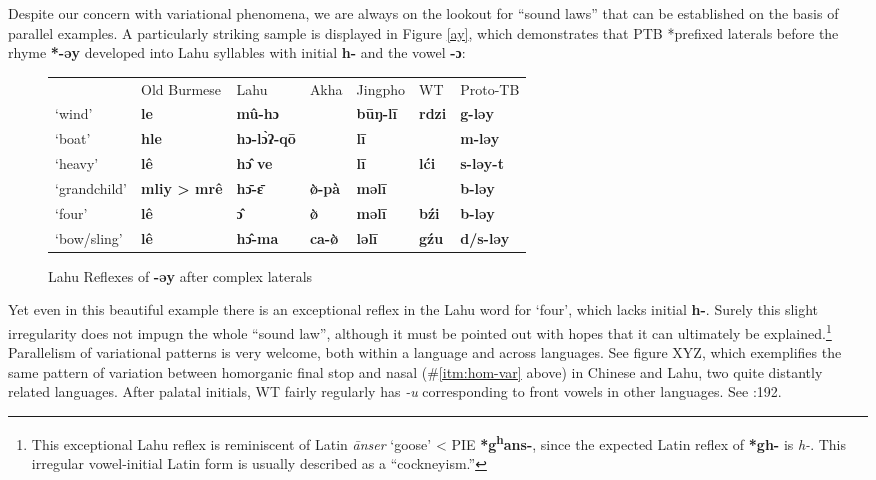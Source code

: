 Despite our concern with variational phenomena, we are always on the lookout for “sound laws” that can be established on the basis of parallel examples. A particularly striking sample is displayed in Figure \ref{ay}, which demonstrates that PTB *prefixed laterals before the rhyme \textbf{*-əy} developed into Lahu syllables with initial \textbf{h-} and the vowel \textbf{-ɔ}:

\begin{figure}
\caption{Lahu Reflexes of \textbf{-əy} after complex laterals}
\begin{tabular}{l l l l l l l}
 & Old Burmese & Lahu & Akha & Jingpho & WT & Proto-TB\\
‘wind’ & \textbf{le} & \textbf{mû-hɔ} & \textbf{} & \textbf{būŋ-lī} & \textbf{rdzi} & \textbf{g-ləy}\\
‘boat’ & \textbf{hle} & \textbf{hɔ-lɔ̀ʔ-qō} & \textbf{} & \textbf{lī} & \textbf{} & \textbf{m-ləy}\\
‘heavy’ & \textbf{lê} & \textbf{hɔ̂ ve} & \textbf{} & \textbf{lī} & \textbf{lći} & \textbf{s-ləy-t}\\
‘grandchild’ & \textbf{mliy > mrê} & \textbf{hɔ̄-ɛ̄} & \textbf{ø̀-pà} & \textbf{məlī} & \textbf{} & \textbf{b-ləy}\\
‘four’ & \textbf{lê} & \textbf{ɔ̂} & \textbf{ø̀} & \textbf{məlī} & \textbf{bźi} & \textbf{b-ləy}\\
‘bow/sling’ & \textbf{lê} & \textbf{hɔ̂-ma} & \textbf{ca-ø̀} & \textbf{ləlī} & \textbf{gźu} & \textbf{d/s-ləy}\\
\end{tabular}
\end{figure}

Yet even in this beautiful example there is an exceptional reflex in the Lahu word for ‘four’, which lacks initial \textbf{h-}. Surely this slight irregularity does not impugn the whole “sound law”, although it must be pointed out with hopes that it can ultimately be explained.\footnote{This exceptional Lahu reflex is reminiscent of Latin \textit{\=anser} ‘goose’ < PIE \textbf{*g\textsuperscript{h}ans-}, since the expected Latin reflex of \textbf{*gh-} is \textit{h-}. This irregular vowel-initial Latin form is usually described as a “cockneyism.”} Parallelism of variational patterns is very welcome, both within a language and across languages. See figure XYZ, which exemplifies the same pattern of variation between homorganic final stop and nasal (\#\ref{itm:hom-var} above) in Chinese and Lahu, two quite distantly related languages. After palatal initials, WT fairly regularly has \textit{-u} corresponding to front vowels in other languages. See \textit{}:192.


